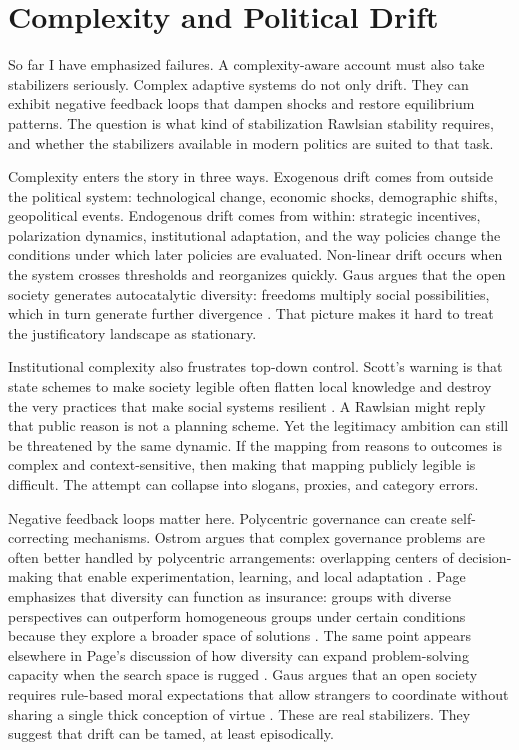 \documentclass[12pt]{article}
\begin{document}
\section{Complexity and Political Drift}

So far I have emphasized failures. A complexity-aware account must also take stabilizers seriously. Complex adaptive systems do not only drift. They can exhibit negative feedback loops that dampen shocks and restore equilibrium patterns. The question is what kind of stabilization Rawlsian stability requires, and whether the stabilizers available in modern politics are suited to that task.

Complexity enters the story in three ways. Exogenous drift comes from outside the political system: technological change, economic shocks, demographic shifts, geopolitical events. Endogenous drift comes from within: strategic incentives, polarization dynamics, institutional adaptation, and the way policies change the conditions under which later policies are evaluated. Non-linear drift occurs when the system crosses thresholds and reorganizes quickly. Gaus argues that the open society generates autocatalytic diversity: freedoms multiply social possibilities, which in turn generate further divergence \parencite[p.~102]{gaus2021open}. That picture makes it hard to treat the justificatory landscape as stationary.

Institutional complexity also frustrates top-down control. Scott's warning is that state schemes to make society legible often flatten local knowledge and destroy the very practices that make social systems resilient \parencite[pp.~2--3]{scott1998seeing}. A Rawlsian might reply that public reason is not a planning scheme. Yet the legitimacy ambition can still be threatened by the same dynamic. If the mapping from reasons to outcomes is complex and context-sensitive, then making that mapping publicly legible is difficult. The attempt can collapse into slogans, proxies, and category errors.

Negative feedback loops matter here. Polycentric governance can create self-correcting mechanisms. Ostrom argues that complex governance problems are often better handled by polycentric arrangements: overlapping centers of decision-making that enable experimentation, learning, and local adaptation \parencite[pp.~642--643]{ostrom2010polycentric}. Page emphasizes that diversity can function as insurance: groups with diverse perspectives can outperform homogeneous groups under certain conditions because they explore a broader space of solutions \parencite[p.~123]{page2011diversity}. The same point appears elsewhere in Page's discussion of how diversity can expand problem-solving capacity when the search space is rugged \parencite[p.~161]{page2011diversity}. Gaus argues that an open society requires rule-based moral expectations that allow strangers to coordinate without sharing a single thick conception of virtue \parencite[p.~2]{gaus2016rulebased}. These are real stabilizers. They suggest that drift can be tamed, at least episodically.
\end{document}
